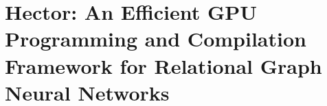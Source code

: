 \chapter{Hector: An Efficient GPU Programming and Compilation Framework for Relational Graph Neural Networks}
\label{ch:hector}







